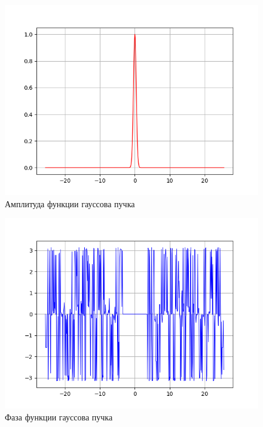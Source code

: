{    	\begin{figure}[H]
       \centering
            \includegraphics[width=\textwidth,height=\textheight,keepaspectratio]{Gause_beam_amplitude_fft.png}
            \caption{Амплитуда функции гауссова пучка}
            \label{beam_ampl_pic}
    \end{figure}
 
    \begin{figure}[H]
       \centering
            \includegraphics[width=\textwidth,height=\textheight,keepaspectratio]{Gauss_Phase_fft.png}
            \caption{Фаза функции гауссова пучка}
            \label{beam_phase_pic}
    \end{figure}
    
}
